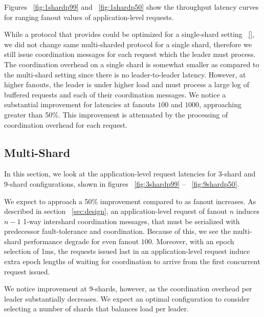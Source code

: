 Figures ~\ref{fig:1shardp99} and ~\ref{fig:1shardp50} show the throughput latency curves for ranging fanout values of application-level requests. 

While a protocol that provides \mdl could be optimized for a single-shard setting ~\ref{}, we did not change same multi-sharded protocol for a single shard, therefore we still issue coordination messages for each request which the leader must process. The coordination overhead on a single shard is somewhat smaller as compared to the multi-shard setting since there is no leader-to-leader latency. However, at higher fanouts, the leader is under higher load and must process a large log of buffered requests and each of their coordination messages. We notice a substantial improvement for latencies at fanouts $100$ and $1000$, approaching greater than 50\%. This improvement is attenuated by the processing of coordination overhead for each request.



\subsection{Multi-Shard}
\label{sec:shards}
In this section, we look at the application-level request latencies for 3-shard and 9-shard configurations, shown in figures ~\ref{fig:3shardp99} -- ~\ref{fig:9shardp50}.

We expect \system to approach a 50\% improvement compared to \mpaxos as fanout increases.
As described in section ~\ref{sec:design}, an application-level request of fanout $n$ induces $n-1$ 1-way intershard coordination messages, that must be serialized with predecessor fault-tolerance and coordination.
Because of this, we see the multi-shard performance degrade for even fanout $100$. 
Moreover, with an epoch selection of 1ms, the requests issued last in an application-level request induce extra epoch lengths of waiting for coordination to arrive from the first concurrent request issued.

We notice improvement at 9-shards, however, as the coordination overhead per leader substantially decreases. We expect an optimal configuration to consider selecting a number of shards that balances load per leader.

